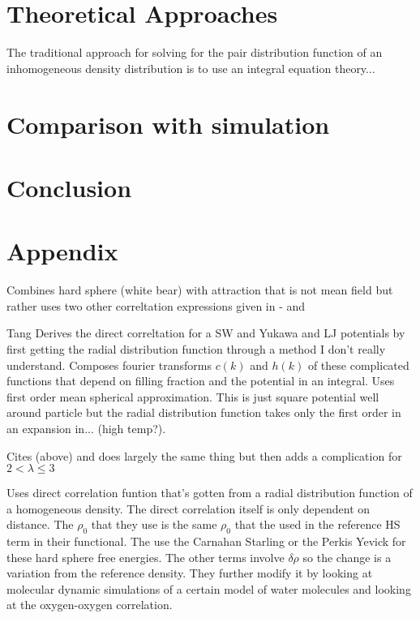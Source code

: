 \documentclass[letterpaper,twocolumn,amsmath,amssymb,pre,aps,10pt]{revtex4-1}
\begin{document}
\section{Theoretical Approaches}

The traditional approach for solving for the pair distribution
function of an inhomogeneous density distribution is to use an
integral equation theory...

\section{Comparison with simulation}\label{sec:comparison}

\section{Conclusion}

\appendix

\section*{Appendix}
\cite{jin2011perturbative} Combines hard sphere (white bear) with
attraction that is not mean field but rather uses two other
correltation expressions given in -\cite{tang2008accurate} and
\cite{hlushak2009direct}

Tang \cite{tang2008accurate}Derives the direct correltation for a SW
and Yukawa and LJ potentials by first getting the radial distribution
function through a method I don't really understand.  Composes fourier
transforms $c(k)$ and $h(k)$ of these complicated functions that
depend on filling fraction and the potential in an integral. Uses
first order mean spherical approximation.  This is just square
potential well around particle but the radial distribution function
takes only the first order in an expansion in... (high temp?).

\cite{hlushak2009direct} Cites \cite{tang2008accurate} (above) and
does largely the same thing but then adds a complication for $2 <
\lambda \leq 3$

\cite{levesque2012scalar} Uses direct correlation funtion that's
gotten from a radial distribution function of a homogeneous density.
The direct correlation itself is only dependent on distance.  The
$\rho_0$ that they use is the same $\rho_0$ that the used in the
reference HS term in their functional.  The use the Carnahan Starling
or the Perkis Yevick for these hard sphere free energies.  The other
terms involve $\delta\rho$ so the change is a variation from the
reference density.  They further modify it by looking at molecular
dynamic simulations of a certain model of water molecules and looking
at the oxygen-oxygen correlation.
\end{document}
